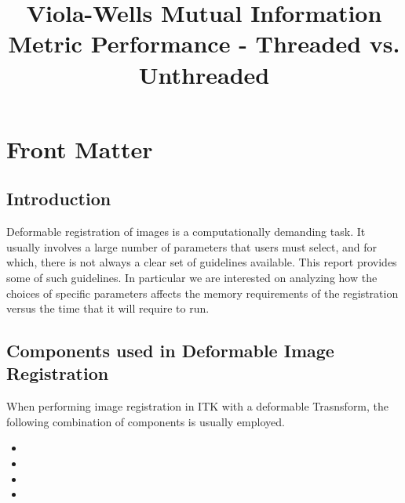 \documentclass{InsightArticle}
\title{Viola-Wells Mutual Information Metric Performance - Threaded vs. Unthreaded}
\begin{document}
\ifpdf
\else
\fi


\maketitle


\ifhtml
\chapter*{Front Matter\label{front}}
\fi


\begin{abstract}
\noindent
\end{abstract}

\tableofcontents

\section{Introduction}

Deformable registration of images is a computationally demanding task. It
usually involves a large number of parameters that users must select, and for
which, there is not always a clear set of guidelines available. This report
provides some of such guidelines. In particular we are interested on analyzing
how the choices of specific parameters affects the memory requirements of the
registration versus the time that it will require to run.


\section{Components used in Deformable Image Registration}

When performing image registration in ITK with a deformable Trasnsform, the
following combination of components is usually employed.

\begin{itemize}
\item {}
\item {}
\item {}
\item {}
\end{itemize}
\end{document}
